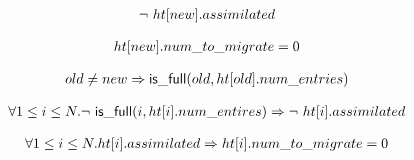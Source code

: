\begin{lemma}
  \begin{equation*}
\begin{array}{l}        
  \mbox{$\neg\ \mbox{$ht[new]$}.assimilated$}
\end{array}
\end{equation*}  
\label{new_cannot_be_assimilated}
\end{lemma}  

\begin{lemma}
  \begin{equation*}
\begin{array}{l}      
  \mbox{$ht[new]$}.num\_to\_migrate = 0
\end{array}
\end{equation*}  
\label{new_cannot_migrate}
\end{lemma}  

\begin{lemma}
  \begin{equation*}
\begin{array}{l}        
  old \neq new \Rightarrow \mathsf{is\_full}(old, \mbox{$ht[old]$}.num\_entries)
\end{array}
  \end{equation*}  
  \label{old_is_full}
\end{lemma}  

\begin{lemma}
  \begin{equation*}
\begin{array}{l}      
  \forall 1 \leq i \leq N. \mbox{$\neg\ \mathsf{is\_full}(i,\mbox{$ht[i]$}.num\_entires)$} \Rightarrow \mbox{$\neg\ \mbox{$ht[i]$}.assimilated$}
  \end{array}
\end{equation*}
  \label{not_full_cannot_be_assimilated}  
\end{lemma}  

\begin{lemma}
  \begin{equation*}
\begin{array}{l}        
  \forall 1 \leq i \leq N. \mbox{$ht[i]$}.assimilated \Rightarrow \mbox{$ht[i]$}.num\_to\_migrate = 0
\end{array}
\end{equation*}
  \label{assimilated_nothing_to_migrate}  
\end{lemma}  

